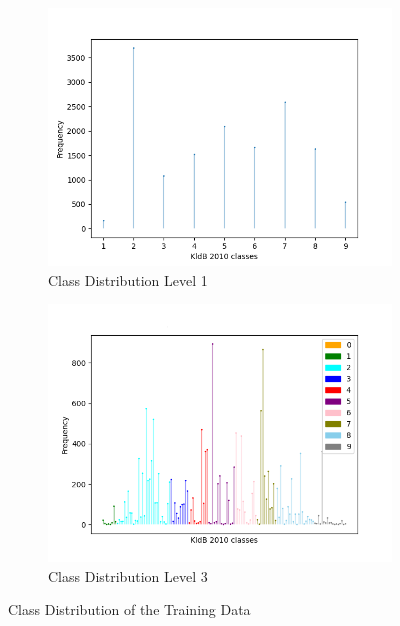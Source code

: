 \documentclass[12pt, a4paper, titlepage]{article}
\begin{document}
\begin{figure}
  \begin{subfigure}{.5\textwidth}
    \centering
    \includegraphics[width=.9\linewidth]{training_data_short_L1.png}
    \caption{\label{fig: F9} Class Distribution Level 1}
  \end{subfigure}%
  \begin{subfigure}{.5\textwidth}
    \centering
    \includegraphics[width=.9\linewidth]{training_data_short_L3.png}
    \caption{\label{fig: F10} Class Distribution Level 3}
  \end{subfigure}
  \caption{Class Distribution of the Training Data}
  \end{figure}
\end{document}
